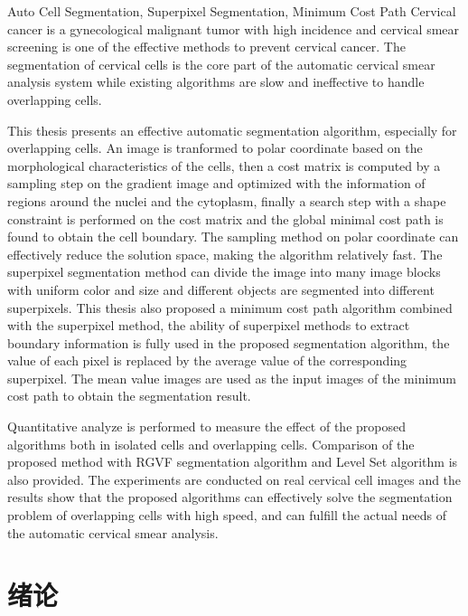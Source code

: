 \documentclass[nomlist,masters]{seuthesix}
\begin{document}
\begin{englishabstract}{Auto Cell Segmentation, Superpixel Segmentation, Minimum Cost Path}
Cervical cancer is a gynecological malignant tumor with high incidence and cervical smear screening is one of the effective methods to prevent cervical cancer. The segmentation of cervical cells is the core part of the automatic cervical smear analysis system while existing algorithms are slow and ineffective to handle overlapping cells.

This thesis presents an effective automatic segmentation algorithm, especially for overlapping cells. An image is tranformed to polar coordinate based on the morphological characteristics of the cells, then a cost matrix is computed by a sampling step on the gradient image and optimized with the information of regions around the nuclei and the cytoplasm, finally a search step with a shape constraint is performed on the cost matrix and the global minimal cost path is found to obtain the cell boundary. The sampling method on polar coordinate can effectively reduce the solution space, making the algorithm relatively fast. The superpixel segmentation method can divide the image into many image blocks with uniform color and size and different objects are segmented into different superpixels. This thesis also proposed a minimum cost path algorithm combined with the superpixel method, the ability of superpixel methods to extract boundary information is fully used in the proposed segmentation algorithm, the value of each pixel is replaced by the average value of the corresponding superpixel. The mean value images are used as the input images of the minimum cost path to obtain the segmentation result.

Quantitative analyze is performed to measure the effect of the proposed algorithms both in isolated cells and overlapping cells. Comparison of the proposed method with RGVF segmentation algorithm and Level Set algorithm is also provided. The experiments are conducted on real cervical cell images and the results show that the proposed algorithms can effectively solve the segmentation problem of overlapping cells with high speed, and can fulfill the actual needs of the automatic cervical smear analysis.

\end{englishabstract}

\tableofcontents

\mainmatter
\chapter{绪论}
\end{document}
